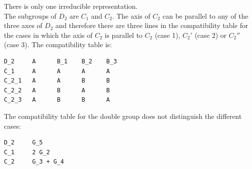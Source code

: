 \documentclass[12pt,a4paper]{article}
\begin{document}
There is only one irreducible representation. \\
The subgroups of $D_2$ are $C_1$ and $C_2$. The axis of $C_2$ can be parallel to
any of the three axes of $D_2$ and therefore there are three lines in the
compatibility table for the cases in which the axis of $C_2$ is parallel to 
$C_2$ (case 1), $C_2'$ (case 2) or $C_2''$ (case 3). 
The compatibility table is:
\begin{verbatim}
D_2     A      B_1    B_2    B_3  
C_1     A      A      A      A   
C_2_1   A      A      B      B     
C_2_2   A      B      A      B   
C_2_3   A      B      B      A
\end{verbatim}
The compatibility table for the double group does not distinguish the different
cases:
\begin{verbatim}
D_2     G_5  
C_1     2 G_2
C_2     G_3 + G_4
\end{verbatim}

\newpage
\end{document}
